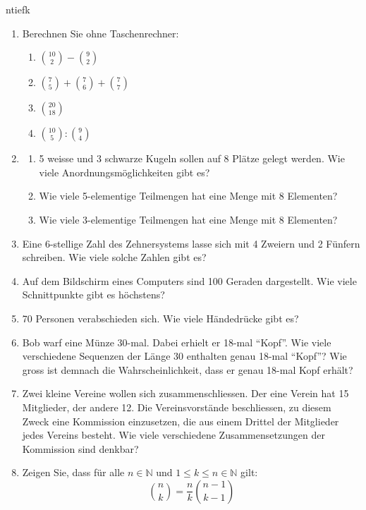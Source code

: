 \begin{ueb}
    {}{ntiefk}
    \begin{enumerate}
        \item Berechnen Sie ohne Taschenrechner:
              \begin{enumerate}
                  \item \(\binom{10}{2}-\binom{9}{2}\)
                  \item \(\binom{7}{5}+\binom{7}{6}+\binom{7}{7}\)
                  \item \(\binom{20}{18}\)
                  \item \(\binom{10}{5} : \binom{9}{4}\)
              \end{enumerate}
        \item
              \begin{enumerate}
                  \item 5 weisse und 3 schwarze Kugeln sollen auf 8 Plätze gelegt werden. Wie viele Anordnungsmöglichkeiten gibt es?
                  \item Wie viele 5-elementige Teilmengen hat eine Menge mit 8 Elementen?
                  \item Wie viele 3-elementige Teilmengen hat eine Menge mit 8 Elementen?
              \end{enumerate}
        \item Eine 6-stellige Zahl des Zehnersystems lasse sich mit 4 Zweiern und 2 Fünfern schreiben. Wie viele solche Zahlen gibt es?
        \item Auf dem Bildschirm eines Computers sind 100 Geraden dargestellt. Wie viele Schnittpunkte gibt es höchstens?
        \item 70 Personen verabschieden sich. Wie viele Händedrücke gibt es?
        \item Bob warf eine Münze 30-mal. Dabei erhielt er 18-mal ``Kopf''. Wie viele verschiedene Sequenzen der Länge 30 enthalten genau 18-mal ``Kopf''? Wie gross ist demnach die Wahrscheinlichkeit, dass er genau 18-mal Kopf erhält?
        \item Zwei kleine Vereine wollen sich zusammenschliessen. Der eine Verein hat 15 Mitglieder, der andere 12. Die Vereinsvorstände beschliessen, zu diesem Zweck eine Kommission einzusetzen, die aus einem Drittel der Mitglieder jedes Vereins besteht. Wie viele verschiedene Zusammensetzungen der Kommission sind denkbar?
        \item Zeigen Sie, dass für alle \( n \in \mathbb{N} \) und \( 1 \leq k \leq n \in \mathbb{N} \) gilt:
              \[
                  \binom{n}{k} = \frac{n}{k} \binom{n-1}{k-1}
              \]
    \end{enumerate}
\end{ueb}


